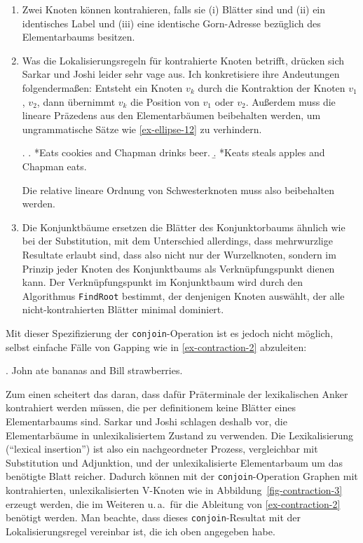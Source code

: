 \begin{enumerate}
  \item Zwei Knoten können kontrahieren, falls sie (i) Blätter sind und (ii) ein identisches Label und (iii) eine identische Gorn-Adresse bezüglich des Elementarbaums besitzen.
  \item Was die Lokalisierungsregeln für kontrahierte Knoten betrifft, drücken sich Sarkar und Joshi leider sehr vage aus. Ich konkretisiere ihre Andeutungen folgenderma\ss en: Entsteht ein Knoten $v_k$ durch die Kontraktion der Knoten $v_1$, $v_2$, dann übernimmt $v_k$ die Position von $v_1$ oder $v_2$. Au\ss erdem muss die lineare Präzedens aus den Elementarbäumen beibehalten werden, um ungrammatische Sätze wie \ref{ex-ellipse-12} zu verhindern.

\ex.\label{ex-ellipse-12}
\a. *Eats cookies and Chapman drinks beer.
\b. *Keats steals apples and Chapman eats.

Die relative lineare Ordnung von Schwesterknoten muss also beibehalten werden. 
\item Die Konjunktbäume ersetzen die Blätter des Konjunktorbaums ähnlich wie bei der Substitution, mit dem Unterschied allerdings, dass mehrwurzlige Resultate erlaubt sind, dass also nicht nur der Wurzelknoten, sondern im Prinzip jeder Knoten des Konjunktbaums als Verknüpfungspunkt dienen kann. Der Verknüpfungspunkt im Konjunktbaum wird durch den Algorithmus {\tt FindRoot} bestimmt, der denjenigen Knoten auswählt, der alle nicht-kontrahierten Blätter minimal dominiert. 
\end{enumerate} 

Mit dieser Spezifizierung der {\tt conjoin}-Operation ist es jedoch nicht möglich, selbst einfache Fälle von Gapping wie in \ref{ex-contraction-2} abzuleiten:

\ex. \label{ex-contraction-2}John ate bananas and Bill strawberries. 

Zum einen scheitert das daran, dass dafür Präterminale der lexikalischen Anker kontrahiert werden müssen, die per definitionem keine Blätter eines Elementarbaums sind. Sarkar und Joshi schlagen deshalb vor, die Elementarbäume in unlexikalisiertem Zustand zu verwenden. Die Lexikalisierung ("`lexical insertion"') ist also ein nachgeordneter Prozess, vergleichbar mit Substitution und Adjunktion, und der unlexikalisierte Elementarbaum um das benötigte Blatt reicher. Dadurch können mit der {\tt conjoin}-Operation Graphen mit kontrahierten, unlexikalisierten V-Knoten wie in Abbildung~\ref{fig-contraction-3} erzeugt werden, die im Weiteren u.\,a.\ für die Ableitung von \ref{ex-contraction-2} benötigt werden. Man beachte, dass dieses {\tt conjoin}-Resultat mit der Lokalisierungsregel vereinbar ist, die ich oben angegeben habe.

